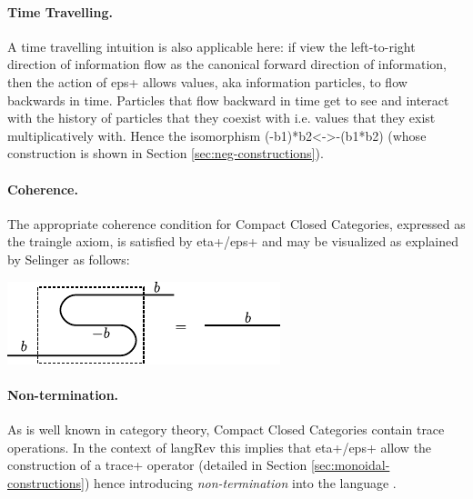 \documentclass[preprint]{sigplanconf}
\begin{document}
\begin{multicols}{2}
\begin{center}
\end{center}
  
\begin{center}
\end{center}  
\end{multicols}

\paragraph*{Time Travelling.}
A time travelling intuition is also applicable here: if view the
left-to-right direction of information flow as the canonical forward
direction of information, then the action of {{eps+}} allows values,
aka information particles, to flow backwards in time. Particles that
flow backward in time get to see and interact with the history of
particles that they coexist with i.e. values that they exist
multiplicatively with. Hence the isomorphism {{(-b1)*b2<->-(b1*b2)}}
(whose construction is shown in Section \ref{sec:neg-constructions}).

\paragraph*{Coherence.}
The appropriate coherence condition for Compact Closed Categories,
expressed as the traingle axiom, is satisfied by {{eta+}}/{{eps+}} and
may be visualized as explained by Selinger
\cite{springerlink:10.1007/978-3-642-12821-94} as follows:

\begin{center}
  \includegraphics{diagrams/coherence.pdf}
\end{center}

\paragraph*{Non-termination.}
As is well known in category theory, Compact Closed Categories contain
trace operations.  In the context of {{langRev}} this implies that
{{eta+}}/{{eps+}} allow the construction of a {{trace+}} operator
(detailed in Section \ref{sec:monoidal-constructions}) hence
introducing \emph{non-termination} into the language
\cite{infeffects}.
\end{document}
